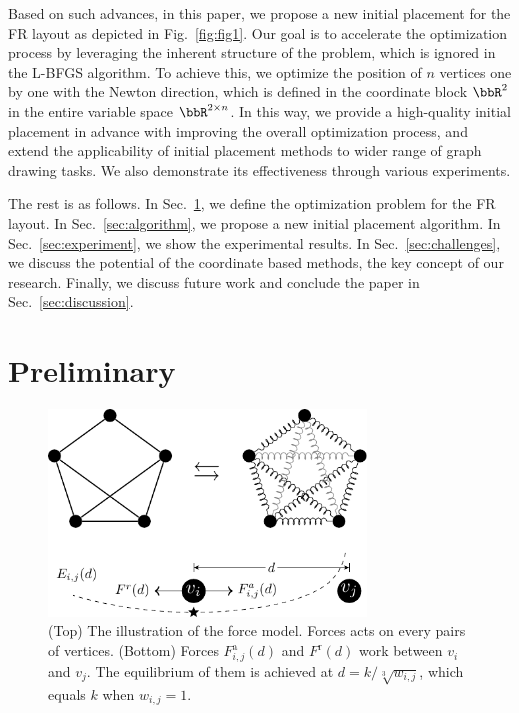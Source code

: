 \documentclass[dvipdfmx,10pt,journal,compsoc]{IEEEtran}
\begin{document}
Based on such advances, in this paper, we propose a new initial placement for the FR layout as depicted in Fig.~\ref{fig:fig1}.
Our goal is to accelerate the optimization process by leveraging the inherent structure of the problem, which is ignored in the L-BFGS algorithm.
To achieve this, we optimize the position of $n$ vertices one by one with the Newton direction, which is defined in the coordinate block $\bbR^2$ in the entire variable space $\bbR^{2 \times n}$.
In this way, we provide a high-quality initial placement in advance with improving the overall optimization process, and extend the applicability of initial placement methods to wider range of graph drawing tasks.
We also demonstrate its effectiveness through various experiments.

The rest is as follows.
In Sec.~\ref{sec:preliminary}, we define the optimization problem for the FR layout.
In Sec.~\ref{sec:algorithm}, we propose a new initial placement algorithm.
In Sec.~\ref{sec:experiment}, we show the experimental results.
In Sec.~\ref{sec:challenges}, we discuss the potential of the coordinate based methods, the key concept of our research.
Finally, we discuss future work and conclude the paper in Sec.~\ref{sec:discussion}.

\section{Preliminary}\label{sec:preliminary}

\begin{figure}[t]
  \centering
  \includegraphics[height=5.5cm]{fr_layout/fr_layout.pdf}
  \caption{
    (Top) The illustration of the force model. Forces acts on every pairs of vertices.
    (Bottom) Forces $F_{i,j}^\mathrm{a}(d)$ and $F^\mathrm{r}(d)$ work between $v_i$ and $v_j$. The equilibrium of them is achieved at $d = k/\sqrt[3]{w_{i,j}}$, which equals $k$ when $w_{i,j} = 1$.
  }
  \label{fig:frLayout}
\end{figure}
\end{document}

